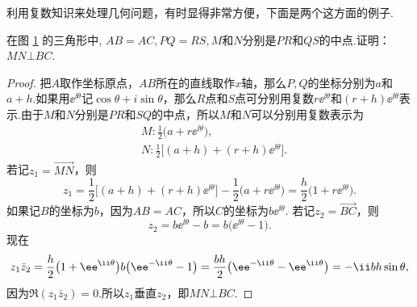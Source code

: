 利用复数知识来处理几何问题，有时显得非常方便，下面是两个这方面的例子.
\begin{example}
在图 \ref{fig1.3} 的三角形中, $AB=AC,PQ=RS,M$和$N$分别是$PR$和$QS$的中点.证明： $MN\bot BC$.
\end{example}
\begin{figure}[!ht]
\centering
{}
\caption{}\label{fig1.3}
\end{figure}
\begin{proof}
把$A$取作坐标原点，$AB$所在的直线取作$x$轴，那么$P,Q$的坐标分别为$a$和$a+h$.如果用$\ee^{\ii\theta} $记$\cos\theta+i\sin\theta$，那么$R$点和$S$点可分别用复数$r\ee^{\ii\theta}$和$(r+h)\ee^{\ii\theta}$表示.由于$M$和$N$分别是$PR$和$SQ$的中点，所以$M$和$N$可以分别用复数表示为
\begin{align*}
  &M:\frac12\big(a+r\ee^{\ii\theta}\big),\\
  &N:\frac12\big[(a+h)+(r+h)\ee^{\ii\theta}\big].
\end{align*}
若记$z_1=\overrightarrow{MN}$，则
\[z_1=\frac12\big[(a+h)+(r+h)\ee^{\ii\theta}\big]-\frac12\big(a+r\ee^{\ii\theta}\big)=\frac h2\big(1+r\ee^{\ii\theta}\big).\]
如果记$B$的坐标为$b$，因为$AB=AC$，所以$C$的坐标为$b\ee^{\ii\theta}$. 若记$z_2=\overrightarrow{BC}$，则
\[z_2=b\ee^{\ii\theta}-b=b\big(\ee^{\ii\theta}-1\big).\]
现在
\[
z_1\bar z_2=\frac h2\big(1+\ee^{\ii\theta}\big)b\big(\ee^{-\ii\theta}-1\big)\\
=\frac{bh}2\big(\ee^{-\ii\theta}-\ee^{\ii\theta}\big)=-\ii bh\sin\theta,
\]
因为$\Re(z_1\bar z_2)=0$.所以$z_1$垂直$z_2$，即$MN\bot BC$.
\end{proof}

